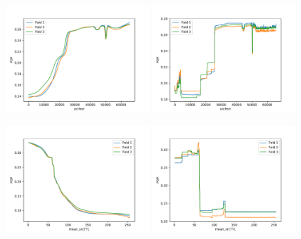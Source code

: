 \documentclass[sigconf,nonacm]{acmart}
\begin{document}
\begin{figure}[p]
\includegraphics[width=0.48\textwidth]{plots/pdp/sourceTransportPort_nn.pdf}
\includegraphics[width=0.48\textwidth]{plots/pdp/sourceTransportPort_rf.pdf}

\includegraphics[width=0.48\textwidth]{plots/pdp/apply(mean(ipTTL),forward)_nn.pdf}
\includegraphics[width=0.48\textwidth]{plots/pdp/apply(mean(ipTTL),forward)_rf.pdf}


\end{figure}
\end{document}
